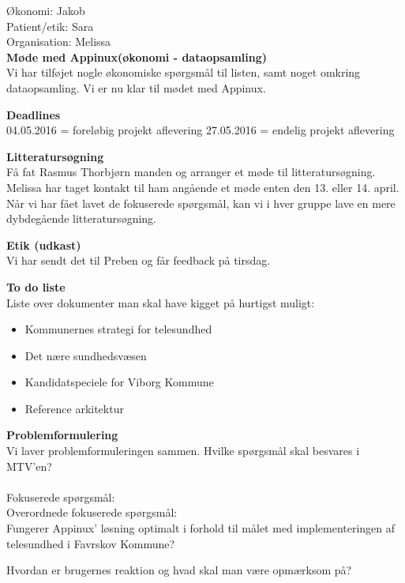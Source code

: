 Økonomi:
Jakob\\

Patient/etik:
Sara\\

Organisation:
Melissa\\


\textbf{Møde med Appinux(økonomi - dataopsamling)}
\\
Vi har tilføjet nogle økonomiske spørgsmål til listen, samt noget omkring dataopsamling. Vi er nu klar til mødet med Appinux. 

\textbf{Deadlines}
\\
04.05.2016 = foreløbig projekt aflevering
27.05.2016 = endelig projekt aflevering

\textbf{Litteratursøgning}
\\
Få fat Rasmus Thorbjørn manden og arranger et møde til litteratursøgning.
Melissa har taget kontakt til ham angående et møde enten den 13. eller 14. april.\\
Når vi har fået lavet de fokuserede spørgsmål, kan vi i hver gruppe lave en mere dybdegående litteratursøgning. 

\textbf{Etik (udkast)}
\\
Vi har sendt det til Preben og får feedback på tirsdag. 

\textbf{To do liste}
\\
Liste over dokumenter man skal have kigget på hurtigst muligt:
\begin{itemize}
	\item Kommunernes strategi for telesundhed
	\item Det nære sundhedsvæsen
	\item Kandidatspeciele for Viborg Kommune
	\item Reference arkitektur
\end{itemize}

\textbf{Problemformulering}
\\
Vi laver problemformuleringen sammen. Hvilke spørgsmål skal besvares i MTV'en?\\ \\

Fokuserede spørgsmål: \\

Overordnede fokuserede spørgsmål: \\
Fungerer Appinux' løsning optimalt i forhold til målet med implementeringen af telesundhed i Favrskov Kommune?

Hvordan er brugernes reaktion og hvad skal man være opmærksom på?

